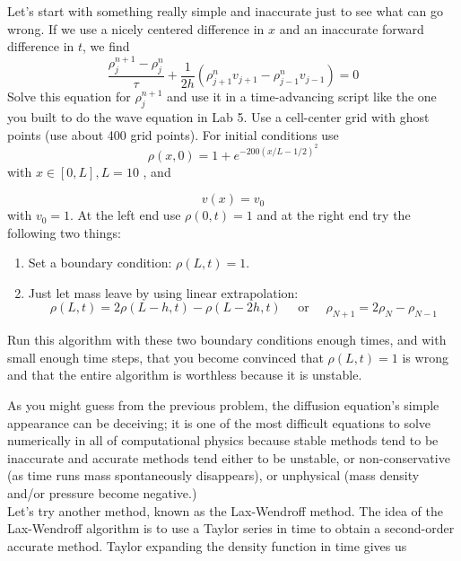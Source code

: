 \begin{problem}\label{P10.1}
Let\rq s start with something really simple and inaccurate just to see what can
go wrong. If we use a nicely centered difference in $x$ and an inaccurate
forward difference in $t$, we find
\begin{equation}\label{eq:102}
\frac{\rho_{j}^{n+1}-\rho_{j}^{n}}{\tau}+\frac{1}{2 h}\left(\rho_{j+1}^{n} v_{j+1}-\rho_{j-1}^{n} v_{j-1}\right)=0
\end{equation}
Solve this equation for $\rho_{j}^{n+1}$ and use it in a time-advancing script like the one you built to do the wave equation in Lab 5. Use a cell-center grid with ghost points (use about 400 grid points). For initial conditions use
\begin{equation}\label{eq:103}
\rho(x, 0)=1+e^{-200(x / L-1 / 2)^{2}}
\end{equation}
with $ x \in[0, L], L=10$ , and


\begin{equation}\label{eq:104}
v(x)=v_0
\end{equation}
with $v_{0}=1$. At the left end use $\rho(0, t)=1$ and at the right end try the following two things:
\begin{enumerate}[label=(\roman*)]
\item Set a boundary condition: $\rho(L, t)=1$.
\item Just let mass leave by using linear extrapolation:
	\begin{equation}\label{eq:105}
\rho(L, t)=2 \rho(L-h, t)-\rho(L-2 h, t) \quad \text { or } \quad \rho_{N+1}=2 \rho_{N}-\rho_{N-1}
\end{equation}


\end{enumerate}
Run this algorithm with these two boundary conditions enough times, and with small enough time steps, that you become convinced that $\rho(L, t)=1$ is wrong and that the entire algorithm is worthless because it is unstable.\\
\end{problem}
As you might guess from the previous problem, the diffusion equation's simple appearance can be deceiving; it is one of the most difficult equations to solve numerically in all of computational physics because stable methods tend to be inaccurate and accurate methods tend either to be unstable, or non-conservative (as time runs mass spontaneously disappears), or unphysical (mass density and/or pressure become negative.)\\
Let\rq s try another method, known as the Lax-Wendroff method. The idea of the Lax-Wendroff algorithm is to use a Taylor series in time to obtain a second-order accurate method. Taylor expanding the density function in time gives us

